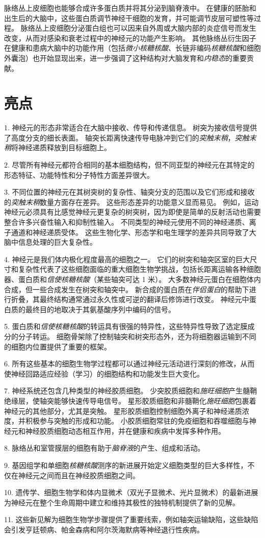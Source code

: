 脉络丛上皮细胞也能够合成许多蛋白质并将其分泌到脑脊液中。
在健康的胚胎和出生后的大脑中，这些蛋白质调节神经干细胞的发育，并可能调节皮层可塑性等过程。
脉络丛上皮细胞分泌蛋白组也可以因来自外周或大脑内部的炎症信号而发生改变，从而对感染和衰老过程中的神经元的功能产生影响。
其他脉络丛衍生因子在健康和患病大脑中的功能作用（包括\textit{微小核糖核酸}、长链非编码\textit{核糖核酸}和细胞外囊泡）也开始显现出来，进一步强调了这种结构对大脑发育和\textit{内稳态}的重要贡献。



\section{亮点}

1. 神经元的形态非常适合在大脑中接收、传导和传递信息。
树突为接收信号提供了高度分支的细长表面。
轴突长距离快速传导电脉冲到它们的\textit{突触末稍}，\textit{突触末稍}将神经递质释放到目标细胞上。


2. 尽管所有神经元都符合相同的基本细胞结构，但不同亚型的神经元在其特定的形态特征、功能特性和分子特性方面差异很大。


3. 不同位置的神经元在其树突树的复杂性、轴突分支的范围以及它们形成和接收的\textit{突触末稍}数量方面存在差异。
这些形态差异的功能意义显而易见。
例如，运动神经元必须具有比感觉神经元更复杂的树突树，因为即使是简单的反射活动也需要整合许多兴奋性输入和抑制性输入。
不同类型的神经元使用不同的神经递质、离子通道和神经递质受体。
这些生物化学、形态学和电生理学的差异共同导致了大脑中信息处理的巨大复杂性。


4. 神经元是我们体内极化程度最高的细胞之一。
它们的树突和轴突区室的巨大尺寸和复杂性代表了这些细胞面临的重大细胞生物学挑战，包括长距离运输各种细胞器、蛋白质和\textit{信使核糖核酸}（某些轴突可达 1 米）。
大多数神经元蛋白在细胞体内合成，但一些合成发生在树突和轴突中。
新合成的蛋白质在\textit{伴侣蛋白}的帮助下进行折叠，其最终结构通常通过永久性或可逆的翻译后修饰进行改变。
神经元中蛋白质的最终目的地取决于其氨基酸序列中编码的信号。


5. 蛋白质和\textit{信使核糖核酸}的转运具有很强的特异性，这些特异性导致了选定膜成分的分子转运。
细胞骨架除了控制轴突和树突形态外，还为将细胞器运输到不同的细胞内位置提供了重要的框架。


6. 所有这些基本的细胞生物学过程都可以通过神经元活动进行深刻的修改，从而使神经回路适应经验（学习）的细胞结构和功能发生巨大变化。


7. 神经系统还包含几种类型的神经胶质细胞。
少突胶质细胞和\textit{施旺细胞}产生髓鞘绝缘层，使轴突能够快速传导电信号。
星形胶质细胞和非髓鞘化\textit{施旺细胞}包裹着神经元的其他部分，尤其是突触。 
星形胶质细胞控制细胞外离子和神经递质浓度，并积极参与突触的形成和功能。
小胶质细胞常驻的免疫细胞和吞噬细胞与神经元和神经胶质细胞动态相互作用，并在健康和疾病中发挥多种作用。


8. 脉络丛和室管膜层的细胞有助于\textit{脑脊液}的产生、组成和活动。


9. 基因组学和单细胞\textit{核糖核酸}测序的新进展开始定义细胞类型的巨大多样性，不仅在神经元之间而且在神经胶质细胞之间。


10. 遗传学、细胞生物学和体内显微术（双光子显微术、光片显微术）的最新进展为神经元在整个生命周期中建立和维持其极性的独特机制提供了新的见解。


11. 这些新见解为细胞生物学步骤提供了重要线索，例如轴突运输缺陷，这些缺陷会引发亨廷顿病、帕金森病和阿尔茨海默病等神经退行性疾病。




